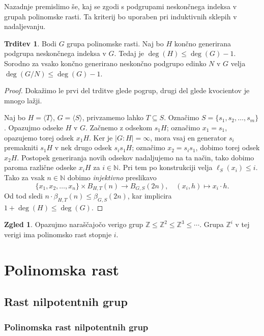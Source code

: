 \documentclass[11pt]{book}
\def\NN{\mathbb{N}}
\def\ZZ{\mathbb{Z}}
\theoremstyle{definition}
\theoremstyle{zgled}
\newtheorem*{zgled}{Zgled}
\theoremstyle{odprtproblem}
\theoremstyle{domacanaloga}
\newenvironment{dokaz}
    {\color{siva}\begin{proof}}
    {\end{proof}}
\theoremstyle{izrek}
\newtheorem*{trditev}{Trditev}
\begin{document}
Nazadnje premislimo še, kaj se zgodi s podgrupami neskončnega indeksa v grupah polinomske rasti. Ta kriterij bo uporaben pri induktivnih sklepih v nadaljevanju.

\begin{trditev}
Bodi $G$ grupa polinomske rasti. Naj bo $H$ končno generirana podgrupa neskončnega indeksa v $G$. Tedaj je $\deg(H) \leq \deg(G) - 1$. Sorodno za vsako končno generirano neskončno podgrupo edinko $N$ v $G$ velja $\deg(G/N) \leq \deg(G) - 1$.
\end{trditev}

\begin{dokaz}
Dokažimo le prvi del trditve glede pogrup, drugi del glede kvocientov je mnogo lažji. 

Naj bo $H = \langle T \rangle$, $G = \langle S \rangle$, privzamemo lahko $T \subseteq S$. Označimo $S = \{ s_1, s_2, \dots, s_m \}$. Opazujmo odseke $H$ v $G$. Začnemo z odsekom $s_1 H$; označimo $x_1 = s_1$, opazujemo torej odsek $x_1 H$. Ker je $|G:H| = \infty$, mora vsaj en generator $s_i$ premakniti $s_1H$ v nek drugo odsek $s_i s_1 H$; označimo $x_2 = s_i s_1$, dobimo torej odsek $x_2 H$. Postopek generiranja novih odsekov nadaljujemo na ta način, tako dobimo paroma različne odseke $x_i H$ za $i \in \NN$. Pri tem po konstrukciji velja $\ell_S(x_i) \leq i$. Tako za vsak $n \in \NN$ dobimo {\em injektivno} preslikavo
\[
\{ x_1, x_2, \dots, x_n \} \times B_{H,T}(n) \to B_{G,S}(2n), \quad
(x_i, h) \mapsto x_i \cdot h.
\]
Od tod sledi $n \cdot \beta_{H,T}(n) \leq \beta_{G,S}(2n)$, kar implicira $1 + \deg(H) \leq \deg(G)$.
\end{dokaz}

\begin{zgled}
Opazujmo naraščajočo verigo grup $\ZZ \leq \ZZ^2 \leq \ZZ^3 \leq \cdots$. Grupa $\ZZ^i$ v tej verigi ima polinomsko rast stopnje $i$.
\end{zgled}

\chapter{Polinomska rast}

\section{Rast nilpotentnih grup}

\subsection{Polinomska rast nilpotentnih grup}
\end{document}

